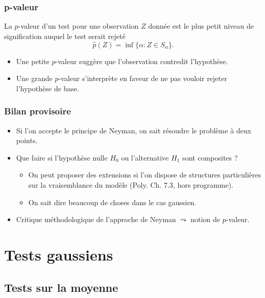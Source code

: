\begin{frame}
\frametitle{p-valeur}
\begin{definition}[p-valeur]
La $p$-valeur d'un test pour une observation $Z$ donnée est le plus petit niveau de signification auquel le test serait rejeté
$$
\hat{p}(Z)= \inf\{ \alpha: Z \in S_\alpha\}.
$$
\end{definition}
\begin{itemize}
\item Une petite $p$-valeur suggère que l'observation contredit l'hypothèse.
\item Une grande $p$-valeur s'interprète en faveur de ne pas vouloir rejeter l'hypothèse de base.
\end{itemize}
\end{frame}

\begin{frame}
\frametitle{Bilan provisoire}
\begin{itemize}
\item Si l'on accepte \alert{le principe de Neyman}, on sait résoudre le problème à deux points.
\item Que faire si l'hypothèse nulle $H_0$ ou l'alternative $H_1$ sont \alert{composites} ?
\begin{itemize}
\item On peut proposer des extensions si l'on dispose de structures particulières sur la vraisemblance du modèle (Poly. Ch. 7.3, hors programme).
\item On sait dire \alert{ beaucoup de choses} dans le cas gaussien.
\end{itemize}
\item \alert{ Critique méthodologique de l'approche de Neyman} $\leadsto$ notion de $p$-valeur.
\end{itemize}
\end{frame}





\section{Tests gaussiens}

\subsection{Tests sur la moyenne}

